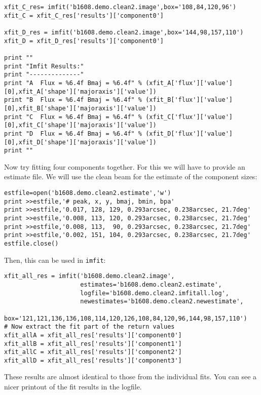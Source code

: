 \begin{verbatim}
xfit_C_res= imfit('b1608.demo.clean2.image',box='108,84,120,96')
xfit_C = xfit_C_res['results']['component0']

xfit_D_res = imfit('b1608.demo.clean2.image',box='144,98,157,110')
xfit_D = xfit_D_res['results']['component0']

print ""
print "Imfit Results:"
print "--------------"
print "A  Flux = %6.4f Bmaj = %6.4f" % (xfit_A['flux']['value'][0],xfit_A['shape']['majoraxis']['value'])
print "B  Flux = %6.4f Bmaj = %6.4f" % (xfit_B['flux']['value'][0],xfit_B['shape']['majoraxis']['value'])
print "C  Flux = %6.4f Bmaj = %6.4f" % (xfit_C['flux']['value'][0],xfit_C['shape']['majoraxis']['value'])
print "D  Flux = %6.4f Bmaj = %6.4f" % (xfit_D['flux']['value'][0],xfit_D['shape']['majoraxis']['value'])
print ""
\end{verbatim}
\normalsize


Now try fitting four components together.  For this we will have to
provide an estimate file.  We will use the clean beam for the estimate
of the component sizes:
\small
\begin{verbatim}
estfile=open('b1608.demo.clean2.estimate','w')
print >>estfile,'# peak, x, y, bmaj, bmin, bpa'
print >>estfile,'0.017, 128, 129, 0.293arcsec, 0.238arcsec, 21.7deg'
print >>estfile,'0.008, 113, 120, 0.293arcsec, 0.238arcsec, 21.7deg'
print >>estfile,'0.008, 113,  90, 0.293arcsec, 0.238arcsec, 21.7deg'
print >>estfile,'0.002, 151, 104, 0.293arcsec, 0.238arcsec, 21.7deg'
estfile.close()
\end{verbatim}
\normalsize
Then, this can be used in {\tt imfit}:
\small
\begin{verbatim}
xfit_all_res = imfit('b1608.demo.clean2.image', 
                     estimates='b1608.demo.clean2.estimate',
                     logfile='b1608.demo.clean2.imfitall.log',
                     newestimates='b1608.demo.clean2.newestimate',
                     box='121,121,136,136,108,114,120,126,108,84,120,96,144,98,157,110')
# Now extract the fit part of the return values
xfit_allA = xfit_all_res['results']['component0']
xfit_allB = xfit_all_res['results']['component1']
xfit_allC = xfit_all_res['results']['component2']
xfit_allD = xfit_all_res['results']['component3']
\end{verbatim}
\normalsize
These results are almost identical to those from the individual fits.
You can see a nicer printout of the fit results in the logfile.

